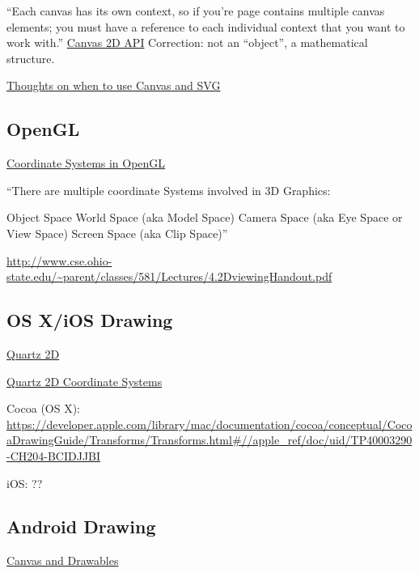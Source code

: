 \documentclass[reqno,12pt]{tufte-handout}
\numberwithin{equation}{subsection}
\numberwithin{equation}{subsection}
\begin{document}
\begin{appendices}
    ``Each canvas has its own context, so if you’re page contains multiple canvas elements; you must have a reference to each individual context that you want to work with.'' \url{Canvas 2D
 API}  Correction: not an ``object'', a mathematical structure.

    \href{http://blogs.msdn.com/b/ie/archive/2011/04/22/thoughts-on-when-to-use-canvas-and-svg.aspx}{Thoughts on when to use Canvas and SVG}

    \subsection{OpenGL}
    \label{subs:opengl}


    \href{http://www.matrix44.net/cms/notes/opengl-3d-graphics/coordinate-systems-in-opengl}{Coordinate Systems in OpenGL}

    ``There are multiple coordinate Systems involved in 3D Graphics:

    Object Space
    World Space (aka Model Space)
    Camera Space (aka Eye Space or View Space)
    Screen Space (aka Clip Space)''

    \url{http://www.cse.ohio-state.edu/~parent/classes/581/Lectures/4.2DviewingHandout.pdf}

    \subsection{OS X/iOS Drawing}

    \href{https://developer.apple.com/library/mac/documentation/graphicsimaging/conceptual/drawingwithquartz2d/dq\_overview/dq\_overview.html}{Quartz 2D}

    \href{https://developer.apple.com/library/mac/documentation/graphicsimaging/conceptual/drawingwithquartz2d/dq\_overview/dq\_overview.html#//apple\_ref/doc/uid/TP30001066-CH202-CJBBAEEC}{Quartz 2D Coordinate Systems}

    Cocoa (OS X):  \url{https://developer.apple.com/library/mac/documentation/cocoa/conceptual/CocoaDrawingGuide/Transforms/Transforms.html#//apple\_ref/doc/uid/TP40003290-CH204-BCIDJJBI}

    iOS:  ??

    \subsection{Android Drawing}

    \href{http://developer.android.com/guide/topics/graphics/2d-graphics.html}{Canvas and Drawables}


\end{appendices}
\end{document}
